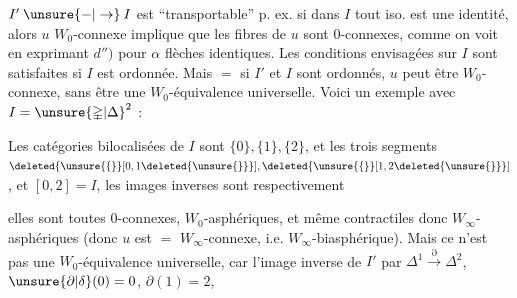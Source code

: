 $I'\mathbin{\unsure{-|\to}}I$ est ``transportable'' p. ex. si dans $I$ tout iso. est une identité, alors $u$ $W_0$-connexe implique que les fibres de $u$ sont $0$-connexes, comme on voit en  exprimant $d'')$ pour $\alpha$ flèches identiques. Les conditions envisagées sur $I$ sont satisfaites si $I$ est ordonnée. Mais $=$ si $I'$ et $I$ sont  ordonnés, $u$ peut être $W_0$-connexe, sans être une $W_0$-équivalence universelle. Voici un exemple avec $I=\unsure{\mathbb{\Delta}|\Delta}^2$ :


Les catégories bilocalisées de $I$ sont  $\{0\},\{1\},\{2\}$, et les trois segments $\deleted{\unsure{\{}}[0,1\deleted{\unsure{\}}}],\deleted{\unsure{\{}}[1,2\deleted{\unsure{\}}}]$, et $[0,2]=I$, les images inverses sont respectivement


elles sont toutes $0$-connexes,  \deleted{\unsure{$=$}} $W_0$-asphériques, et même  contractiles donc $W_\infty$-asphériques (donc $u$ est $=$ $W_\infty$-connexe, i.e. $W_\infty$-biasphérique). Mais ce n'est pas une $W_0$-équivalence universelle, car l'image inverse de $I'$ par $\mathbb{\Delta}^1\xrightarrow{\partial}\mathbb{\Delta}^2$, $\unsure{\partial|\delta}(0)=0$, $\partial(1)=2$,
